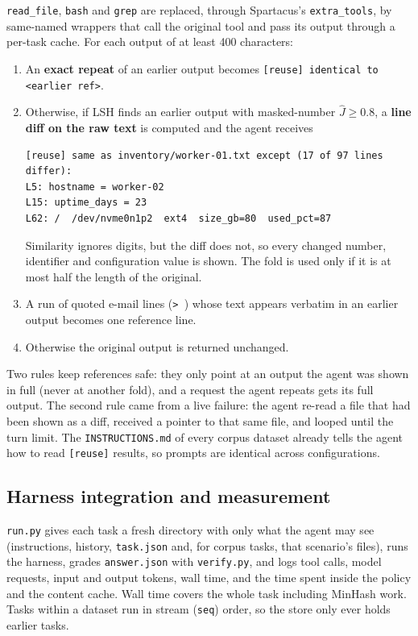 \documentclass[11pt]{article}
\begin{document}
\texttt{read\_file}, \texttt{bash} and \texttt{grep} are replaced, through Spartacus's
\texttt{extra\_tools}, by same-named wrappers that call the original tool and pass its
output through a per-task cache. For each output of at least 400 characters:

\begin{enumerate}
  \item An \textbf{exact repeat} of an earlier output becomes
        \texttt{[reuse] identical to <earlier ref>}.
  \item Otherwise, if LSH finds an earlier output with masked-number $\hat J \ge 0.8$, a
        \textbf{line diff on the raw text} is computed and the agent receives
\begin{lstlisting}
[reuse] same as inventory/worker-01.txt except (17 of 97 lines differ):
L5: hostname = worker-02
L15: uptime_days = 23
L62: /  /dev/nvme0n1p2  ext4  size_gb=80  used_pct=87
\end{lstlisting}
        Similarity ignores digits, but the diff does not, so every changed number, identifier
        and configuration value is shown. The fold is used only if it is at most half the
        length of the original.
  \item A run of quoted e-mail lines (\texttt{> }) whose text appears verbatim in an
        earlier output becomes one reference line.
  \item Otherwise the original output is returned unchanged.
\end{enumerate}

Two rules keep references safe: they only point at an output the agent was shown in full
(never at another fold), and a request the agent repeats gets its full output. The second
rule came from a live failure: the agent re-read a file that had been shown as a diff,
received a pointer to that same file, and looped until the turn limit. The
\texttt{INSTRUCTIONS.md} of every corpus dataset already tells the agent how to read
\texttt{[reuse]} results, so prompts are identical across configurations.

\subsection{Harness integration and measurement}

\texttt{run.py} gives each task a fresh directory with only what the agent may see
(instructions, history, \texttt{task.json} and, for corpus tasks, that scenario's files),
runs the harness, grades \texttt{answer.json} with \texttt{verify.py}, and logs tool calls,
model requests, input and output tokens, wall time, and the time spent inside the policy and
the content cache. Wall time covers the whole task including MinHash work. Tasks within a
dataset run in stream (\texttt{seq}) order, so the store only ever holds earlier tasks.
\end{document}
